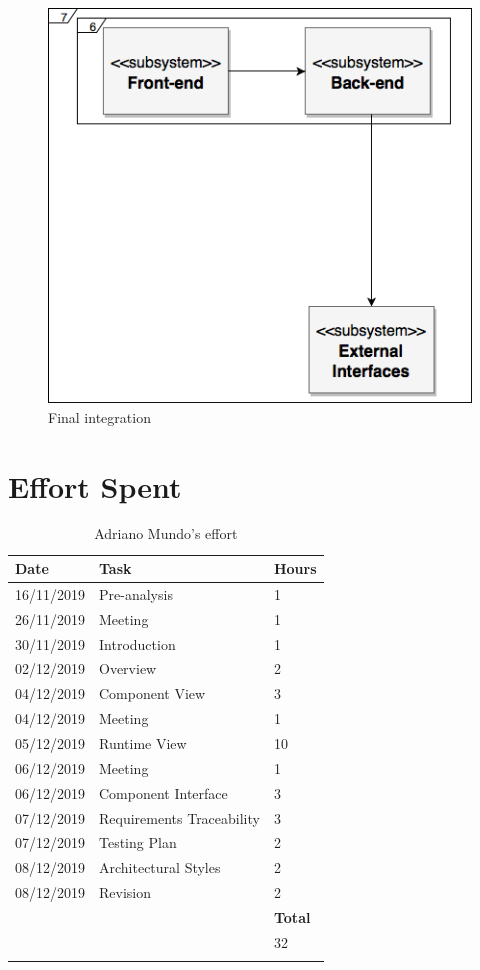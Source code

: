 \documentclass{article}
\begin{document}
	\begin{figure}[H]
			\centering
			\includegraphics[scale=0.5]{Images/Diagrams/Testing/integration_diagram_3.png}
			\caption{Final integration}
	\end{figure}
	\pagebreak
		
\section{Effort Spent}
\begin{longtable}{| p{2 cm} | p{6 cm} | p{1 cm} |} 
			\hline
			{\bf Date} & {\bf Task} & {\bf Hours}\\
			\hline
			16/11/2019 & Pre-analysis & 1 \\
			\hline
			26/11/2019 & Meeting & 1 \\
			\hline
			30/11/2019 & Introduction & 1 \\
			\hline
			02/12/2019 & Overview & 2 \\
			\hline
			04/12/2019 & Component View & 3 \\
			\hline
			04/12/2019 & Meeting & 1 \\
			\hline
			05/12/2019 & Runtime View & 10 \\
			\hline
			06/12/2019 & Meeting & 1 \\
			\hline
			06/12/2019 & Component Interface & 3 \\
			\hline
			07/12/2019 & Requirements Traceability & 3 \\
			\hline
			07/12/2019 & Testing Plan & 2 \\
			\hline
			08/12/2019 & Architectural Styles & 2 \\
			\hline
			08/12/2019 & Revision & 2 \\
			\hline
			& & {\bf Total} \\
			\hline
			& & 32 \\
			\hline			
			\caption{Adriano Mundo's effort} 
\end{longtable}
\end{document}
